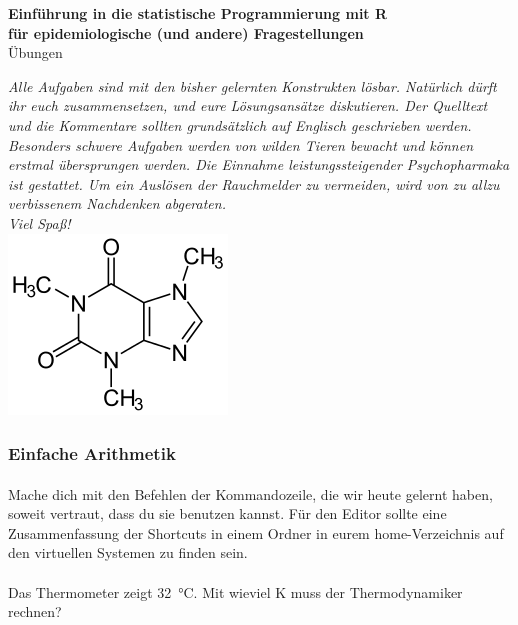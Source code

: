 \documentclass[paper=A4, pagesize, DIV=calc, smallheadings,
fontsize=12pt, expansion=false]{scrreprt}
\begin{document}
\pagestyle{empty}
\LARGE
\begin{center}
\textbf{Einführung in die statistische Programmierung mit R}\\
\Large\textbf{für epidemiologische (und andere) Fragestellungen}\\
\large{Übungen}
\end{center}
\normalsize
\textit{Alle Aufgaben sind mit den bisher gelernten Konstrukten lösbar. Natürlich dürft ihr euch zusammensetzen, und eure Lösungsansätze diskutieren.
Der Quelltext und die Kommentare sollten grundsätzlich auf Englisch geschrieben werden. 
Besonders schwere Aufgaben werden von wilden Tieren bewacht und können erstmal übersprungen werden.
Die Einnahme leistungssteigender Psychopharmaka ist gestattet. Um ein Auslösen der Rauchmelder zu vermeiden, wird von zu allzu verbissenem Nachdenken abgeraten.\\
Viel Spaß!
}\\
\vspace{2em}\hspace*{30em}
\includegraphics[width=0.1\linewidth]{./imgs/Caffeine.png}
\large\textsl{}
\normalsize
{}
\subsubsection*{Einfache Arithmetik}
\paragraph{}
Mache dich mit den Befehlen der Kommandozeile, die wir heute gelernt haben, soweit vertraut, dass du sie 
benutzen kannst. Für den Editor sollte eine Zusammenfassung der Shortcuts in einem Ordner in eurem home-Verzeichnis auf 
den virtuellen Systemen zu finden sein.%

\paragraph{}
Das Thermometer zeigt \SI{32}{\degreeCelsius}. Mit wieviel \si{K} muss der Thermodynamiker rechnen?
\end{document}

